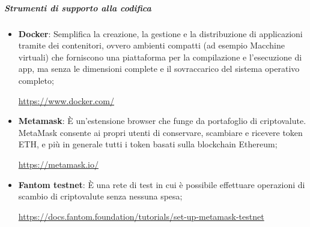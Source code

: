         \subparagraph{Strumenti di supporto alla codifica}
        \begin{itemize}
            \item \textbf{Docker}: Semplifica la creazione, la gestione e la distribuzione di applicazioni tramite dei contenitori, ovvero ambienti compatti (ad esempio Macchine virtuali) che forniscono una piattaforma per la compilazione e l'esecuzione di app, ma senza le dimensioni complete e il sovraccarico del sistema operativo completo;
            \begin{center}\url{https://www.docker.com/}\end{center}
            \item \textbf{Metamask}: È un'estensione browser che funge da portafoglio di criptovalute\glo{}. MetaMask consente ai propri utenti di conservare, scambiare e ricevere token\glo{} ETH, e più in generale tutti i token\glo{} basati sulla blockchain\glo{} Ethereum\glo{};
            \begin{center}\url{https://metamask.io/}\end{center}
            \item \textbf{Fantom testnet}: È una rete di test in cui è possibile effettuare operazioni di scambio di criptovalute\glo{} senza nessuna spesa;
            \begin{center}\url{https://docs.fantom.foundation/tutorials/set-up-metamask-testnet}\end{center}
        \end{itemize}